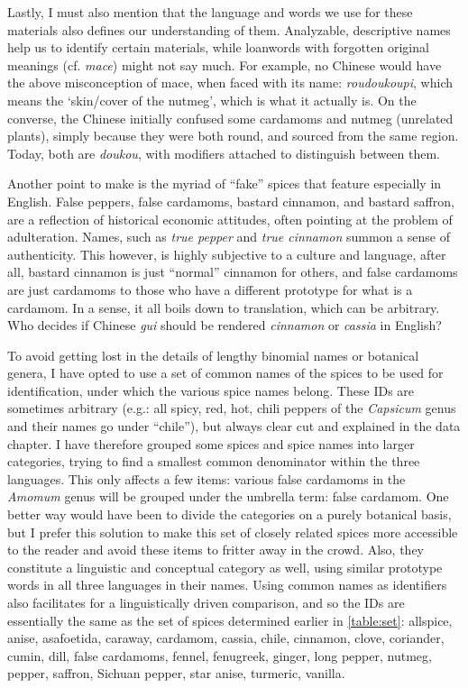 Lastly, I must also mention that the language and words we use for these materials also defines our understanding of them. Analyzable, descriptive names help us to identify certain materials, while loanwords with forgotten original meanings (cf. \textit{mace}) might not say much. For example, no Chinese would have the above misconception of mace, when faced with its name:  \textit{roudoukoupi}, which means the `skin/cover of the nutmeg', which is what it actually is. On the converse, the Chinese initially confused some cardamoms and nutmeg (unrelated plants), simply because they were both round, and sourced from the same region. Today, both are  \textit{doukou}, with modifiers attached to distinguish between them.

Another point to make is the myriad of ``fake'' spices that feature especially in English. False peppers, false cardamoms, bastard cinnamon, and bastard saffron, are a reflection of historical economic attitudes, often pointing at the problem of adulteration. Names, such as \textit{true pepper} and \textit{true cinnamon} summon a sense of authenticity. This however, is highly subjective to a culture and language, after all, bastard cinnamon is just ``normal'' cinnamon for others, and false cardamoms are just cardamoms to those who have a different prototype for what is a cardamom. In a sense, it all boils down to translation, which can be arbitrary. Who decides if Chinese  \textit{gui} should be rendered \textit{cinnamon} or \textit{cassia} in English? 

To avoid getting lost in the details of lengthy binomial names or botanical genera, I have opted to use a set of common names of the spices to be used for identification, under which the various spice names belong. These IDs are sometimes arbitrary (e.g.: all spicy, red, hot, chili peppers of the \textit{Capsicum} genus and their names go under ``chile''), but always clear cut and explained in the data chapter. I have therefore grouped some spices and spice names into larger categories, trying to find a smallest common denominator within the three languages. This only affects a few items: various false cardamoms in the \textit{Amomum} genus will be grouped under the umbrella term: false cardamom. One better way would have been to divide the categories on a purely botanical basis, but I prefer this solution to make this set of closely related spices more accessible to the reader and avoid these items to fritter away in the crowd. Also, they constitute a linguistic and conceptual category as well, using similar prototype words in all three languages in their names. Using common names as identifiers also facilitates for a linguistically driven comparison, and so the IDs are essentially the same as the set of spices determined earlier in \cref{table:set}: allspice, anise, asafoetida, caraway, cardamom, cassia, chile, cinnamon, clove, coriander, cumin, dill, false cardamoms, fennel, fenugreek, ginger, long pepper, nutmeg, pepper, saffron, Sichuan pepper, star anise, turmeric, vanilla.

